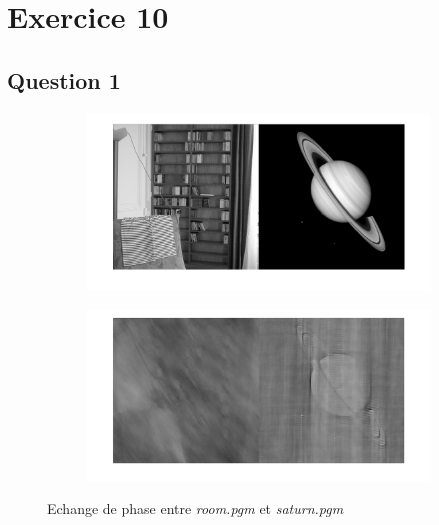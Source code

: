 \documentclass[12pt,a4paper,onecolumn]{article}
\begin{document}
\section{Exercice 10}

\subsection{Question 1}

\begin{figure}[H]
	\centering
	\begin{subfigure}[b]{\textwidth}
		\centering
		\includegraphics[height = 0.30\textheight]{10_1_11}
		\label{10_1_11}
	\end{subfigure}
	\vspace{2cm}
	\begin{subfigure}[b]{\textwidth}
		\centering
		\includegraphics[height = 0.30\textheight]{10_1_12}
		\label{10_1_12}
	\end{subfigure}
	\caption{Echange de phase entre \textit{room.pgm} et \textit{saturn.pgm}}
	\label{10_1}
\end{figure}
\end{document}
